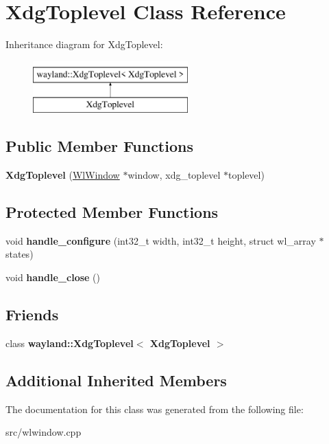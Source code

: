 \hypertarget{classXdgToplevel}{}\section{Xdg\+Toplevel Class Reference}
\label{classXdgToplevel}
Inheritance diagram for Xdg\+Toplevel\+:\begin{figure}[H]
\begin{center}
\leavevmode
\includegraphics[height=2.000000cm]{classXdgToplevel}
\end{center}
\end{figure}
\subsection*{Public Member Functions}
\begin{DoxyCompactItemize}
\item 
\mbox{\label{classXdgToplevel_adf4f0272f681295901ad5cf4ce181d2d}} 
{\bfseries Xdg\+Toplevel} (\mbox{\hyperlink{classWlWindow}{Wl\+Window}} $\ast$window, xdg\+\_\+toplevel $\ast$toplevel)
\end{DoxyCompactItemize}
\subsection*{Protected Member Functions}
\begin{DoxyCompactItemize}
\item 
\mbox{\label{classXdgToplevel_a14bc21cda4145c88e4b1fc9c3dd7a1fd}} 
void {\bfseries handle\+\_\+configure} (int32\+\_\+t width, int32\+\_\+t height, struct wl\+\_\+array $\ast$states)
\item 
\mbox{\label{classXdgToplevel_abe8285b7d85ed94facfc614dd2cd08de}} 
void {\bfseries handle\+\_\+close} ()
\end{DoxyCompactItemize}
\subsection*{Friends}
\begin{DoxyCompactItemize}
\item 
\mbox{\label{classXdgToplevel_ad978e0ebc3ffb165f58743abe154e696}} 
class {\bfseries wayland\+::\+Xdg\+Toplevel$<$ Xdg\+Toplevel $>$}
\end{DoxyCompactItemize}
\subsection*{Additional Inherited Members}


The documentation for this class was generated from the following file\+:\begin{DoxyCompactItemize}
\item 
src/wlwindow.\+cpp\end{DoxyCompactItemize}
